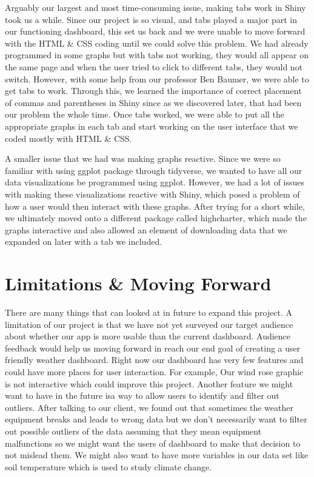 \documentclass[10pt,letterpaper]{article}
\begin{document}
Arguably our largest and most time-consuming issue, making tabs work in
Shiny took us a while. Since our project is so visual, and tabs played a
major part in our functioning dashboard, this set us back and we were
unable to move forward with the HTML \& CSS coding until we could solve
this problem. We had already programmed in some graphs but with tabs not
working, they would all appear on the same page and when the user tried
to click to different tabs, they would not switch. However, with some
help from our professor Ben Baumer, we were able to get tabs to work.
Through this, we learned the importance of correct placement of commas
and parentheses in Shiny since as we discovered later, that had been our
problem the whole time. Once tabs worked, we were able to put all the
appropriate graphs in each tab and start working on the user interface
that we coded mostly with HTML \& CSS.

A smaller issue that we had was making graphs reactive. Since we were so
familiar with using ggplot package through tidyverse, we wanted to have
all our data visualizations be programmed using ggplot. However, we had
a lot of issues with making these visualizations reactive with Shiny,
which posed a problem of how a user would then interact with these
graphs. After trying for a short while, we ultimately moved onto a
different package called highcharter, which made the graphs interactive
and also allowed an element of downloading data that we expanded on
later with a tab we included.

\section{Limitations \& Moving
Forward}\label{limitations-moving-forward}

There are many things that can looked at in future to expand this
project. A limitation of our project is that we have not yet surveyed
our target audience about whether our app is more usable than the
current dashboard. Audience feedback would help us moving forward in
reach our end goal of creating a user friendly weather dashboard. Right
now our dashboard has very few features and could have more places for
user interaction. For example, Our wind rose graphic is not interactive
which could improve this project. Another feature we might want to have
in the future isa way to allow users to identify and filter out
outliers. After talking to our client, we found out that sometimes the
weather equipment breaks and leads to wrong data but we don't
necessarily want to filter out possible outliers of the data assuming
that they mean equipment malfunctions so we might want the users of
dashboard to make that decision to not mislead them. We might also want
to have more variables in our data set like soil temperature which is
used to study climate change.
\end{document}
